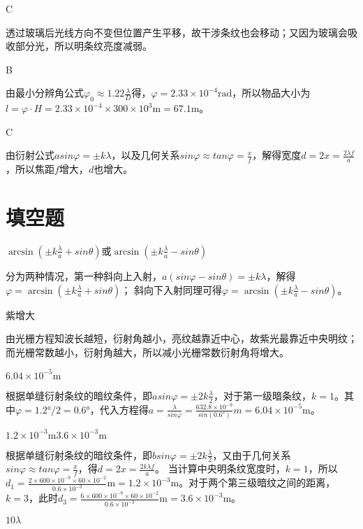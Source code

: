 \exercise C

\solve
透过玻璃后光线方向不变但位置产生平移，故干涉条纹也会移动；又因为玻璃会吸收部分光，所以明条纹亮度减弱。

\exercise B

\solve
由最小分辨角公式$\varphi_0\approx1.22\frac{\lambda}{D}$得，$\varphi=2.33\times10^{-4}\mathrm{rad}$，所以物品大小为$l=\varphi\cdot H=2.33\times10^{-4}\times300\times10^{3}\mathrm{m}=67.1\mathrm{m}$。

\exercise C

\solve
由衍射公式$asin\varphi=\pm k\lambda$，以及几何关系$sin\varphi\approx tan\varphi=\frac{x}{f}$，解得宽度$d=2x=\frac{2\lambda f}{a}$，所以焦距$f$增大，$d$也增大。

\section{填空题}
\exercise $\arcsin(\pm k\frac{\lambda}{a}+sin\theta)$或$\arcsin(\pm k\frac{\lambda}{a}-sin\theta)$

\solve
分为两种情况，第一种斜向上入射，$a(sin\varphi-sin\theta)=\pm k\lambda$，解得$\varphi=\arcsin(\pm k\frac{\lambda}{a}+sin\theta)$；
斜向下入射同理可得$\varphi=\arcsin(\pm k\frac{\lambda}{a}-sin\theta)$。

\exercise 紫\quad 增大

\solve
由光栅方程知波长越短，衍射角越小，亮纹越靠近中心，故紫光最靠近中央明纹；而光栅常数越小，衍射角越大，所以减小光栅常数衍射角将增大。

\exercise $6.04\times10^{-5}\mathrm{m}$

\solve
根据单缝衍射条纹的暗纹条件，即$asin\varphi=\pm2k\frac{\lambda}{2}$，对于第一级暗条纹，$k=1$。其中$\varphi=1.2°/2=0.6°$，代入方程得$a=\frac{\lambda}{sin\varphi}=\frac{632.8\times10^{-9}}{sin(0.6°)}m=6.04\times10^{-5}\mathrm{m}$。

\exercise $1.2\times10^{-3}\mathrm{m}$\quad $3.6\times10^{-3}\mathrm{m}$

\solve
根据单缝衍射条纹的暗纹条件，即$bsin\varphi=\pm2k\frac{\lambda}{2}$，又由于几何关系$sin\varphi\approx tan\varphi=\frac{x}{f}$，得$d=2x=\frac{2k\lambda f}{a}$。 当计算中央明条纹宽度时，$k=1$，所以$d_1=\frac{2\times600\times10^{-9}\times60\times10^{-2}}{0.6\times10^{-3}}\mathrm{m}=1.2\times10^{-3}\mathrm{m}$。对于两个第三级暗纹之间的距离，$k=3$，此时$d_3=\frac{6\times600\times10^{-9}\times60\times10^{-2}}{0.6\times10^{-3}}\mathrm{m}=3.6\times10^{-3}\mathrm{m}$。

\exercise $10\lambda$

